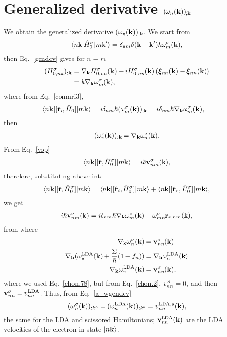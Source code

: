\section{Generalized derivative \texorpdfstring{$(\omega_n(\mathbf{k}))_{;\mathbf{k}}$}{(wn);k}}\label{gwk}

We obtain the
generalized derivative $(\omega_n(\mathbf{k}))_{;\mathbf{k}}$.
We start from
\begin{align}\label{a_conH0}
\langle n\mathbf{k} |\hat{H}^\sigma_0| m\mathbf{k}' \rangle=\delta_{nm}\delta(\mathbf{k}-\mathbf{k}')\hbar\omega^\sigma_m(\mathbf{k})
,
\end{align}
then Eq.~\eqref{gendev} gives for $n=m$
\begin{align}\label{a_genderH0}
(H^\sigma_{0,nn})_{;\mathbf{k}}&=
\nabla_{\mathbf{k}}
H^\sigma_{0,n n}(\mathbf{k})
-
i
H^\sigma_{0,nn}(\mathbf{k})
\left(
\boldsymbol{\xi}_{nn}(\mathbf{k})
-
\boldsymbol{\xi}_{nn}(\mathbf{k})
\right)
\nonumber\\
&=
\hbar\nabla_{\mathbf{k}}\omega^\sigma_m(\mathbf{k})
,
\end{align}
where from Eq.~\eqref{conmri3}, 
\begin{align}\label{a_rih0}
\langle n\mathbf{k} |[\hat{\mathbf{r}}_i,\hat{H}_0]| m\mathbf{k} \rangle&=
i\delta_{nm}\hbar(\omega^\sigma_m(\mathbf{k}))_{;\mathbf{k}}
=
i\delta_{nm}\hbar\nabla_{\mathbf{k}}\omega^\sigma_m(\mathbf{k})
,
\end{align}
then
\begin{align}\label{a_wgendev}
(\omega^\sigma_n(\mathbf{k}))_{;\mathbf{k}}=
\nabla_{\mathbf{k}}\omega^\sigma_n(\mathbf{k})
.
\end{align}
From Eq.~\eqref{vop} 
\begin{align}\label{a_hr}
\langle n\mathbf{k} |[\hat{\mathbf{r}},\hat{H}^\sigma_0]| m\mathbf{k} \rangle=
i\hbar\mathbf{v}^\sigma_{nm}(\mathbf{k})
,
\end{align}
therefore, substituting above into
\begin{align}\label{a_hrt}
\langle n\mathbf{k} |[\hat{\mathbf{r}},\hat{H}^\sigma_0]| m\mathbf{k} \rangle=
\langle n\mathbf{k} |[\hat{\mathbf{r}}_i,\hat{H}^\sigma_0]| m\mathbf{k} \rangle
+
\langle n\mathbf{k} |[\hat{\mathbf{r}}_e,\hat{H}^\sigma_0]| m\mathbf{k} \rangle
,
\end{align}
we get
\begin{align}\label{a_hrt2}
i\hbar\mathbf{v}^\sigma_{nm}(\mathbf{k})=
i\delta_{nm}\hbar\nabla_{\mathbf{k}}\omega^\sigma_m(\mathbf{k})
+
\omega^\sigma_{mn}\mathbf{r}_{e,nm}(\mathbf{k})
,
\end{align}
from where
\begin{align}\label{a_gradw}
\nabla_{\mathbf{k}}\omega^\sigma_n(\mathbf{k})
&=
\mathbf{v}^\sigma_{nn}(\mathbf{k})
\nonumber\\
\nabla_{\mathbf{k}}(\omega^{\mathrm{LDA}}_n(\mathbf{k})+\frac{\Sigma}{\hbar}(1-f_n))
&=
\nabla_{\mathbf{k}}\omega^{\mathrm{LDA}}_n(\mathbf{k})
\nonumber\\
\nabla_{\mathbf{k}}\omega^{\mathrm{LDA}}_n(\mathbf{k})
&=
\mathbf{v}^\sigma_{nn}(\mathbf{k})
,
\end{align}
where we used Eq.~\eqref{chon.78},
but from 
Eq.~\eqref{chon.2}, $v^{\cal S}_{nn}=0$, and then
$\mathbf{v}^\sigma_{nn}=v^{\mathrm{LDA}}_{nn}$.
Thus,  from Eq.~\eqref{a_wgendev}
\begin{align}\label{a_gradw2}
(\omega^\sigma_n(\mathbf{k}))_{;k^{\mathrm{a}}}=
(\omega^{\mathrm{LDA}}_n(\mathbf{k}))_{;k^{\mathrm{a}}}=
v^{\mathrm{LDA},\mathrm{a}}_{nn}(\mathbf{k})
,
\end{align}
the same for the LDA and scissored Hamiltonians; $\mathbf{v}_{nn}^{\mathrm{LDA}}(\mathbf{k})$ are
the LDA velocities of the electron in state $| n\mathbf{k} \rangle$.
